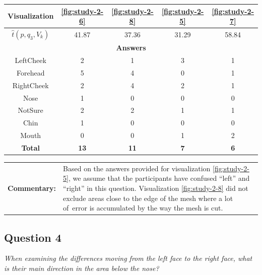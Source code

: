 \begin{center}
\begin{tabular}{| c | c | c | c | c |}
	\hline
	Visualization & \ref{fig:study-2-6} & \ref{fig:study-2-8} & \ref{fig:study-2-5} & \ref{fig:study-2-7}\\ \hline
	\(\widehat{t}(p, q_3, V_k)\) & 41.87 & 37.36 & 31.29 & 58.84\\ \hline
	\multicolumn{5}{|c|}{\bf Answers} \\ \hline
	LeftCheek & 2 & 1 & 3 & 1\\ \hline
	Forehead & 5 & 4 & 0 & 1\\ \hline
	\rowcolor{yellow!30} RightCheek & 2 & 4 & 2 & 1\\ \hline
	Nose & 1 & 0 & 0 & 0\\ \hline
	NotSure & 2 & 2 & 1 & 1\\ \hline
	Chin & 1 & 0 & 0 & 0\\ \hline
	Mouth & 0 & 0 & 1 & 2\\ \hline
	{\bf Total} & {\bf 13} & {\bf 11} & {\bf 7} & {\bf 6}\\ \hline
\end{tabular}
\end{center}

\begin{tabular}{l p{}}
	{\bf Commentary:} & Based on the answers provided for visualization \ref{fig:study-2-5}, we assume that the participants have confused ``left'' and ``right'' in this question. Visualization \ref{fig:study-2-8} did not exclude areas close to the edge of the mesh where a lot of~error is accumulated by the way the mesh is cut. \\
\end{tabular}

\clearpage

\subsection{Question 4}
\label{attch:complete_study_results-question4}

\begin{center}{\it When examining the differences moving from the left face to the right face, what is their main direction in the area below the nose?}\end{center}

